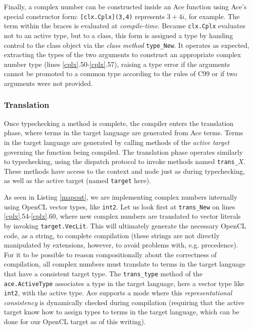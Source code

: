 \documentclass[9pt,preprint]{sigplanconf}
\begin{document}
Finally, a complex number can be constructed inside an Ace function using Ace's special constructor form: \verb|[clx.Cplx](3,4)| represents $3+4i$, for example. The term within the braces is evaluated at \emph{compile-time}. Because \verb|clx.Cplx| evaluates not to an active type, but to a class, this form is assigned a type by handing control to the class object via the \emph{class method} \verb|type_New|. It operates as expected, extracting the types of the two arguments to construct an appropriate complex number type (lines \ref{cplx}.50-\ref{cplx}.57), raising a type error if the arguments cannot be promoted to a common type according to the rules of C99 or if two arguments were not provided.%


\subsubsection{Translation}
Once typechecking a method is complete, the compiler enters the translation phase, where terms in the target language are generated from Ace terms. Terms in the target language are generated by calling methods of the \emph{active target} governing the function being compiled. The translation phase operates similarly to typechecking, using the dispatch protocol to invoke methods named \verb|trans_|$X$. These methods have access to the context and node just as during typechecking, as well as the active target (named \verb|target| here).

As seen in Listing \ref{mapout}, we are implementing complex numbers internally using OpenCL vector types, like \verb|int2|. Let us look first at \verb|trans_New| on lines \ref{cplx}.54-\ref{cplx}.60, where new complex numbers are translated to vector literals by invoking \verb|target.VecLit|. This will ultimately  generate the necessary OpenCL code, as a string, to complete compilation (these strings are not directly manipulated by extensions, however, to avoid problems with, e.g. precedence). For it to be possible to reason compositionally about the correctness of compilation, all complex numbers must translate to terms in the target language that have a consistent target type. The \verb|trans_type| method of the \verb|ace.ActiveType| associates a type in the target language, here a vector type like \verb|int2|, with the active type. Ace supports a mode where this \emph{representational consistency} is dynamically checked during compilation (requiring that the active target know how to assign types to terms in the target language, which can be done  for our OpenCL target as of this writing).
\end{document}
